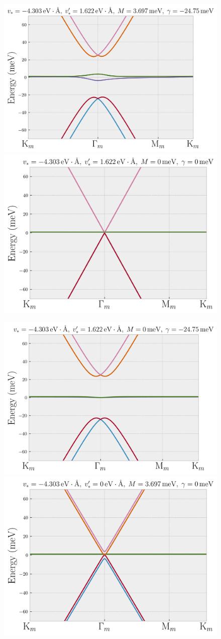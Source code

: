 \begin{figure}[H]
\centering
\includegraphics[height=0.35\linewidth]{fig/thf-correct_params.png}
\includegraphics[height=0.35\linewidth]{fig/thf-no_M_no_gamma.png}
\label{fig:thf-correct_params}
\end{figure}

\begin{figure}[H]
\centering
\includegraphics[height=0.35\linewidth]{fig/thf-no_M.png}
\includegraphics[height=0.35\linewidth]{fig/thf-no_coupling.png}
\label{fig:thf-exploration}
\end{figure}





%



